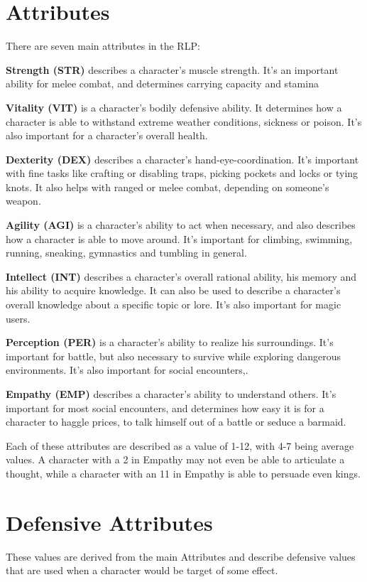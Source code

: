 \section{Attributes}
There are seven main attributes in the RLP:


\textbf{Strength (STR)} describes a character’s muscle strength. It’s an important ability for melee combat, and determines carrying capacity and stamina


\textbf{Vitality (VIT)} is a character’s bodily defensive ability. It determines how a character is able to withstand extreme weather conditions, sickness or poison. It’s also important for a character’s overall health.


\textbf{Dexterity (DEX)} describes a character’s hand-eye-coordination. It’s important with fine tasks like crafting or disabling traps, picking pockets and locks or tying knots. It also helps with ranged or melee combat, depending on someone’s weapon.


\textbf{Agility (AGI)} is a character’s ability to act when necessary, and also describes how a character is able to move around. It’s important for climbing, swimming, running, sneaking, gymnastics and tumbling in general.


\textbf{Intellect (INT)} describes a character’s overall rational ability, his memory and his ability to acquire knowledge. It can also be used to describe a character’s overall knowledge about a specific topic or lore. It’s also important for magic users.


\textbf{Perception (PER)} is a character’s ability to realize his surroundings. It’s important for battle, but also necessary to survive while exploring dangerous environments. It’s also important for social encounters,.


\textbf{Empathy (EMP)} describes a character’s ability to understand others. It’s important for most social encounters, and determines how easy it is for a character to haggle prices, to talk himself out of a battle or seduce a barmaid.


Each of these attributes are described as a value of 1-12, with 4-7 being average values. A character with a 2 in Empathy may not even be able to articulate a thought, while a character with an 11 in Empathy is able to persuade even kings.

\section{Defensive Attributes}
These values are derived from the main Attributes and describe defensive values that are used when a character would be target of some effect.


